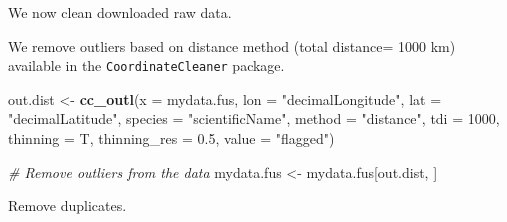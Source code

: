 \documentclass[
]{book}
\newenvironment{Shaded}{\begin{snugshade}}{\end{snugshade}}
\newcommand{\AttributeTok}[1]{\textcolor[rgb]{0.13,0.29,0.53}{#1}}
\newcommand{\CommentTok}[1]{\textcolor[rgb]{0.56,0.35,0.01}{\textit{#1}}}
\newcommand{\DecValTok}[1]{\textcolor[rgb]{0.00,0.00,0.81}{#1}}
\newcommand{\FloatTok}[1]{\textcolor[rgb]{0.00,0.00,0.81}{#1}}
\newcommand{\FunctionTok}[1]{\textcolor[rgb]{0.13,0.29,0.53}{\textbf{#1}}}
\newcommand{\NormalTok}[1]{#1}
\newcommand{\OtherTok}[1]{\textcolor[rgb]{0.56,0.35,0.01}{#1}}
\newcommand{\SpecialCharTok}[1]{\textcolor[rgb]{0.81,0.36,0.00}{\textbf{#1}}}
\newcommand{\StringTok}[1]{\textcolor[rgb]{0.31,0.60,0.02}{#1}}
\begin{document}
We now clean downloaded raw data.

\begin{Shaded}
\end{Shaded}

We remove outliers based on distance method (total distance= 1000 km) available in the \texttt{CoordinateCleaner} package.

\begin{Shaded}
\begin{Highlighting}[]
\NormalTok{out.dist }\OtherTok{\textless{}{-}} \FunctionTok{cc\_outl}\NormalTok{(}\AttributeTok{x =}\NormalTok{ mydata.fus, }\AttributeTok{lon =} \StringTok{"decimalLongitude"}\NormalTok{,}
    \AttributeTok{lat =} \StringTok{"decimalLatitude"}\NormalTok{, }\AttributeTok{species =} \StringTok{"scientificName"}\NormalTok{,}
    \AttributeTok{method =} \StringTok{"distance"}\NormalTok{, }\AttributeTok{tdi =} \DecValTok{1000}\NormalTok{, }\AttributeTok{thinning =}\NormalTok{ T,}
    \AttributeTok{thinning\_res =} \FloatTok{0.5}\NormalTok{, }\AttributeTok{value =} \StringTok{"flagged"}\NormalTok{)}

\CommentTok{\# Remove outliers from the data}
\NormalTok{mydata.fus }\OtherTok{\textless{}{-}}\NormalTok{ mydata.fus[out.dist, ]}
\end{Highlighting}
\end{Shaded}

Remove duplicates.
\end{document}
